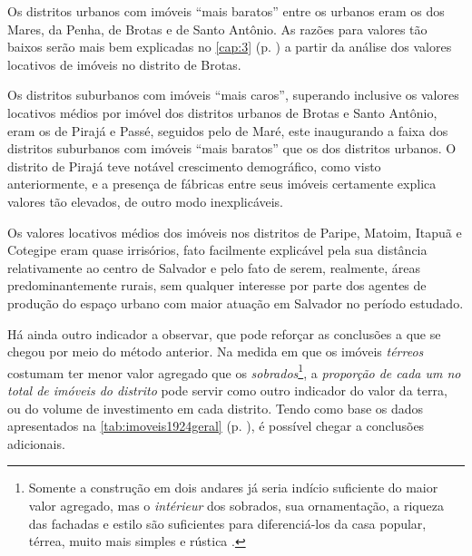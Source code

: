 Os distritos urbanos com imóveis ``mais baratos'' entre os urbanos eram os dos Mares, da Penha, de Brotas e de Santo Antônio. As razões para valores tão baixos serão mais bem explicadas no \autoref{cap:3} (p. \pageref{cap:3}) a partir da análise dos valores locativos de imóveis no distrito de Brotas.

Os distritos suburbanos com imóveis ``mais caros'', superando inclusive os valores locativos médios por imóvel dos distritos urbanos de Brotas e Santo Antônio, eram os de Pirajá e Passé, seguidos pelo de Maré, este inaugurando a faixa dos distritos suburbanos com imóveis ``mais baratos'' que os dos distritos urbanos. O distrito de Pirajá teve notável crescimento demográfico, como visto anteriormente, e a presença de fábricas entre seus imóveis certamente explica valores tão elevados, de outro modo inexplicáveis.

Os valores locativos médios dos imóveis nos distritos de Paripe, Matoim, Itapuã e Cotegipe eram quase irrisórios, fato facilmente explicável pela sua distância relativamente ao centro de Salvador e pelo fato de serem, realmente, áreas predominantemente rurais, sem qualquer interesse por parte dos agentes de produção do espaço urbano com maior atuação em Salvador no período estudado.

Há ainda outro indicador a observar, que pode reforçar as conclusões a que se chegou por meio do método anterior. Na medida em que os imóveis \textit{térreos} costumam ter menor valor agregado que os \textit{sobrados}\footnote{Somente a construção em dois andares já seria indício suficiente do maior valor agregado, mas o \textit{intérieur} dos sobrados, sua ornamentação, a riqueza das fachadas e estilo são suficientes para diferenciá-los da casa popular, térrea, muito mais simples e rústica \cite[pp.~87-111]{ott_formaet1_1955}.}, a \textit{proporção de cada um no total de imóveis do distrito} pode servir como outro indicador do valor da terra, ou do volume de investimento em cada distrito. Tendo como base os dados apresentados na \autoref{tab:imoveis1924geral} (p. \pageref{tab:imoveis1924geral}), é possível chegar a conclusões adicionais.

